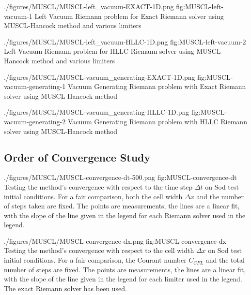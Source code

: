 \quickfigcap
	{./figures/MUSCL/MUSCL-left_vacuum-EXACT-1D.png}
	{fig:MUSCL-left-vacuum-1}
	{
		Left Vacuum Riemann problem for Exact Riemann solver using MUSCL-Hancock method and various limiters
	}
	
\quickfigcap
	{./figures/MUSCL/MUSCL-left_vacuum-HLLC-1D.png}
	{fig:MUSCL-left-vacuum-2}
	{
		Left Vacuum Riemann problem for HLLC Riemann solver using MUSCL-Hancock method and various limiters
	}




\quickfigcap
	{./figures/MUSCL/MUSCL-vacuum_generating-EXACT-1D.png}
	{fig:MUSCL-vacuum-generating-1}
	{
		Vacuum Generating Riemann problem with Exact Riemann solver using MUSCL-Hancock method
	}
	


\quickfigcap
	{./figures/MUSCL/MUSCL-vacuum_generating-HLLC-1D.png}
	{fig:MUSCL-vacuum-generating-2}
	{
		Vacuum Generating Riemann problem with HLLC Riemann solver using MUSCL-Hancock method
	}















\subsection{Order of Convergence Study}



\quickfigcap
	{./figures/MUSCL/MUSCL-convergence-dt-500.png}
	{fig:MUSCL-convergence-dt}
	{
		Testing the method's convergence with respect to the time step $\Delta t$ on Sod test initial conditions.
		For a fair comparison, both the cell width $\Delta x$ and the number of steps taken are fixed.
		The points are measurements, the lines are a linear fit, with the slope of the line given in the legend for each Riemann solver used in the legend.
	}


\quickfigcap
	{./figures/MUSCL/MUSCL-convergence-dx.png}
	{fig:MUSCL-convergence-dx}
	{
		Testing the method's convergence with respect to the cell width $\Delta x$ on Sod test initial conditions.
		For a fair comparison, the Courant number $C_{CFL}$ and the total number of steps are fixed.
		The points are measurements, the lines are a linear fit, with the slope of the line given in the legend for each limiter used in the legend.
		The exact Riemann solver has been used.
	}
	
